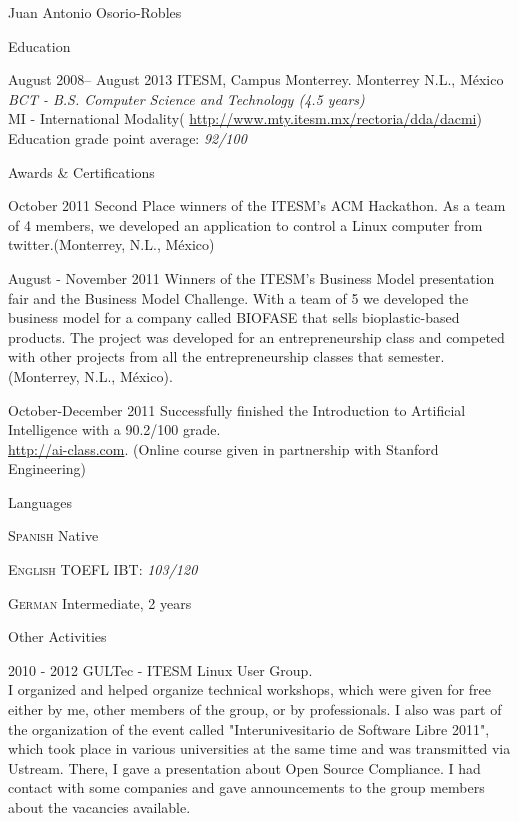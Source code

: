 \documentclass[english,11pt,letterpaper]{article}
\begin{document}
\begin{cv}{Juan Antonio Osorio-Robles}
\begin{cvlist}{Education}
		\item	[August 2008-- August 2013]
			ITESM, Campus Monterrey. Monterrey N.L., M\'{e}xico\\
			\emph{BCT - B.S. Computer Science and Technology (4.5 years)}\\
			MI - International Modality(
            \href{http://www.mty.itesm.mx/rectoria/dda/dacmi}
            {http://www.mty.itesm.mx/rectoria/dda/dacmi})\\
			Education grade point average: \emph{92/100}
	\end{cvlist}

	\begin{cvlist}{Awards \& Certifications}
		\item [October 2011] Second Place winners of the ITESM's ACM Hackathon.
            As a team of 4 members, we developed an application to control a
            Linux computer from twitter.(Monterrey, N.L., M\'{e}xico)
		\item [August - November 2011] Winners of the ITESM's Business Model
            presentation fair and the Business Model Challenge. With a team of
            5 we developed the business model for a company called BIOFASE that
            sells bioplastic-based products. The project was developed for an
            entrepreneurship class and competed with other projects from all
            the entrepreneurship classes that semester.
            (Monterrey, N.L., M\'{e}xico).
		\item [October-December 2011] Successfully finished the Introduction to
            Artificial Intelligence with a 90.2/100 grade. \\
		    \href{http://ai-class.com}{http://ai-class.com}. (Online course
            given in partnership with Stanford Engineering)
	\end{cvlist}


	\begin{cvlist}{Languages}
		\item [\textsc {Spanish}]
				Native
		\item [\textsc {English}]
				TOEFL IBT: \emph{103/120}
		\item [\textsc {German}]
				Intermediate, 2 years
		\end{cvlist}

	\begin{cvlist}{Other Activities}
		\item [2010 - 2012] GULTec - ITESM Linux User Group.\\
			I organized and helped organize technical workshops, which were
            given for free either by me, other members of the group, or by
            professionals. I also was part of the organization of the event
            called "Interunivesitario de Software Libre 2011", which took place
            in various universities at the same time and was transmitted via
            Ustream. There, I gave a presentation about Open Source Compliance.
            I had contact with some companies and gave announcements to the
            group members about the vacancies available.
	\end{cvlist}


\end{cv}
\end{document}
